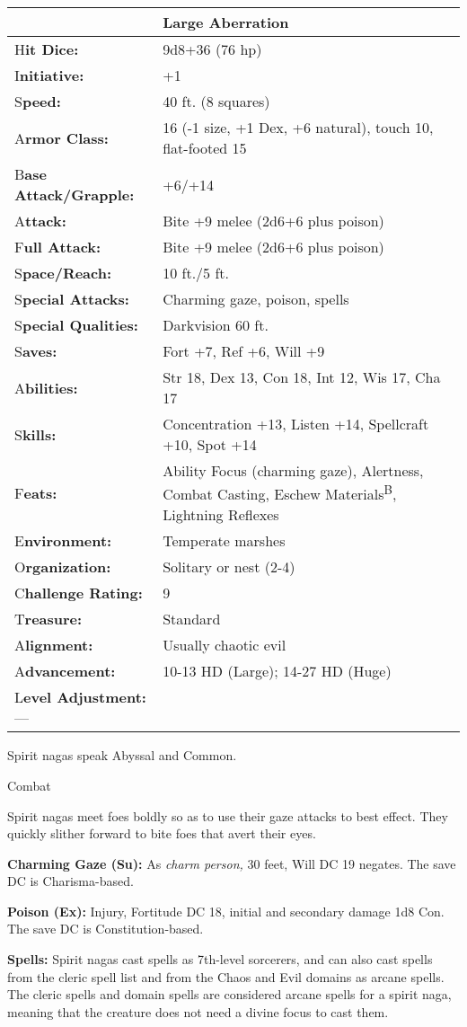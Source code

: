 \documentclass{article}
\begin{document}
\begin{tabular}{|>{\raggedright}p{90pt}|>{\raggedright}p{236pt}|}
\hline
  & Large Aberration\tabularnewline
\hline
H\textbf{it Dice:} & 9d8+36 (76 hp)\tabularnewline
\hline
I\textbf{nitiative:} & +1\tabularnewline
\hline
S\textbf{peed:} & 40 ft. (8 squares)\tabularnewline
\hline
A\textbf{rmor Class:} & 16 (-1 size, +1 Dex, +6 natural), touch 10, flat-footed 
15\tabularnewline
\hline
B\textbf{ase Attack/Grapple:} & +6/+14\tabularnewline
\hline
A\textbf{ttack:} & Bite +9 melee (2d6+6 plus poison)\tabularnewline
\hline
F\textbf{ull Attack:} & Bite +9 melee (2d6+6 plus poison)\tabularnewline
\hline
S\textbf{pace/Reach:} & 10 ft./5 ft.\tabularnewline
\hline
S\textbf{pecial Attacks:} & Charming gaze, poison, spells\tabularnewline
\hline
S\textbf{pecial Qualities:} & Darkvision 60 ft.\tabularnewline
\hline
S\textbf{aves:} & Fort +7, Ref +6, Will +9\tabularnewline
\hline
A\textbf{bilities:} & Str 18, Dex 13, Con 18, Int 12, Wis 17, Cha 17\tabularnewline
\hline
S\textbf{kills:} & Concentration +13, Listen +14, Spellcraft +10, Spot +14 \tabularnewline
\hline
F\textbf{eats:} & Ability Focus (charming gaze), Alertness, Combat Casting, Eschew 
Materials\textsuperscript{B}, Lightning Reflexes\tabularnewline
\hline
E\textbf{nvironment:} & Temperate marshes\tabularnewline
\hline
O\textbf{rganization:} & Solitary or nest (2-4)\tabularnewline
\hline
C\textbf{hallenge Rating:} & 9\tabularnewline
\hline
T\textbf{reasure:} & Standard\tabularnewline
\hline
A\textbf{lignment:} & Usually chaotic evil\tabularnewline
\hline
A\textbf{dvancement:} & 10-13 HD (Large); 14-27 HD (Huge)\tabularnewline
\hline
L\textbf{evel Adjustment:}--- & \tabularnewline
\hline
\end{tabular}

Spirit nagas speak Abyssal and Common.

Combat

Spirit nagas meet foes boldly so as to use their gaze attacks to best effect. They 
quickly slither forward to bite foes that avert their eyes.

\textbf{Charming Gaze (Su): }As \textit{charm person, }30 feet, Will DC 19 negates. 
The save DC is Charisma-based.

\textbf{Poison (Ex): }Injury, Fortitude DC 18, initial and secondary damage 1d8 
Con. The save DC is Constitution-based.

\textbf{Spells:} Spirit nagas cast spells as 7th-level sorcerers, and can also 
cast spells from the cleric spell list and from the Chaos and Evil domains as arcane 
spells. The cleric spells and domain spells are considered arcane spells for a 
spirit naga, meaning that the creature does not need a divine focus to cast them.
\end{document}

